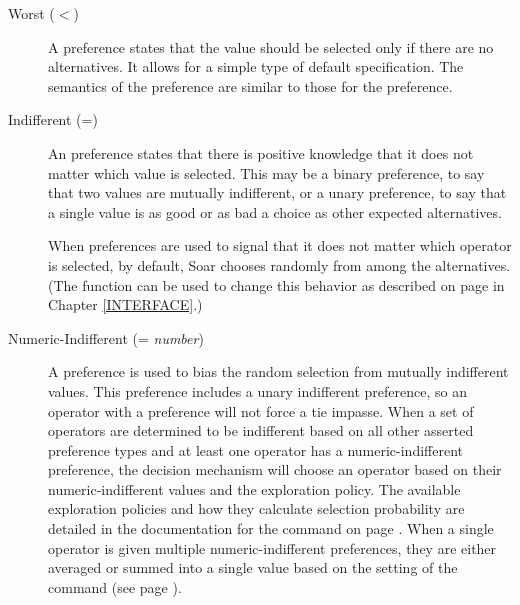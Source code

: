 \begin{description}
\item [Worst ($<$)] A  preference states that the value should be 
selected
        only if there are no alternatives.  It allows for a simple type of
        default specification. The semantics of the  preference
        are similar to those for the  preference.\vspace{-8pt}

\item [Indifferent (=)] An  preference states that there is
        positive knowledge that it does not matter which value is selected.
        This may be a binary preference, to say that two values are mutually
        indifferent, or a unary preference, to say that a single value is as
        good or as bad a choice as other expected alternatives.
        
	When  preferences are used to signal that it does
	not matter which operator is selected, by default, Soar
	chooses randomly from among the alternatives. (The
	 function can be used to change this
	behavior as described on
	page \pageref{decide-indifferent-selection} in Chapter
	\ref{INTERFACE}.)\vspace{-8pt}

\item [Numeric-Indifferent (= \emph{number})]
	A  preference is used to bias the random selection
	from mutually indifferent values. This preference includes a unary
	indifferent preference, so an operator with a 
	preference will not force a tie impasse. When a set of operators are
	determined to be indifferent based on all other asserted preference types
	and at least one operator has a numeric-indifferent preference, the decision
	mechanism will choose an operator based on their numeric-indifferent values
	and the exploration policy. The available exploration policies and how they
	calculate selection probability are detailed in the documentation for the
	 command on page
	\pageref{decide-indifferent-selection}. When a single operator is given multiple
	numeric-indifferent preferences, they are either averaged or summed into a
	single value based on the setting of the 
	command (see page \pageref{decide-numeric-indifferent-mode}).


\end{description}
